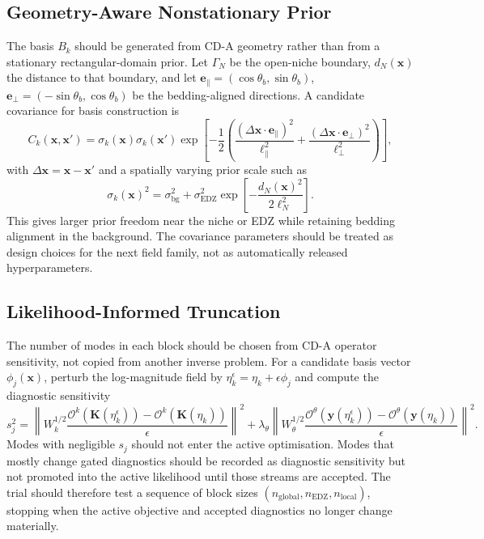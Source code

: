 \documentclass[10pt,a4paper]{article}
\newcommand{\K}{\bm K}
\newcommand{\Oop}{\mathcal O}
\begin{document}
\subsection{Geometry-Aware Nonstationary Prior}

The basis \(B_k\) should be generated from CD-A geometry rather than from a
stationary rectangular-domain prior.  Let \(\Gamma_N\) be the open-niche boundary,
\(d_N(\bm x)\) the distance to that boundary, and let
\(\bm e_\parallel=(\cos\theta_b,\sin\theta_b)\),
\(\bm e_\perp=(-\sin\theta_b,\cos\theta_b)\) be the bedding-aligned directions.
A candidate covariance for basis construction is
\[
C_k(\bm x,\bm x')
=\sigma_k(\bm x)\sigma_k(\bm x')
\exp\!\left[
-\frac12
\left(
\frac{(\Delta\bm x\cdot\bm e_\parallel)^2}{\ell_\parallel^2}
+
\frac{(\Delta\bm x\cdot\bm e_\perp)^2}{\ell_\perp^2}
\right)
\right],
\]
with \(\Delta\bm x=\bm x-\bm x'\) and a spatially varying prior scale such as
\[
  \sigma_k(\bm x)^2
  =\sigma_{\mathrm{bg}}^2
  +\sigma_{\mathrm{EDZ}}^2
   \exp\!\left[-\frac{d_N(\bm x)^2}{2\ell_N^2}\right].
\]
This gives larger prior freedom near the niche or EDZ while retaining bedding
alignment in the background.  The covariance parameters should be treated as
design choices for the next field family, not as automatically released
hyperparameters.

\subsection{Likelihood-Informed Truncation}

The number of modes in each block should be chosen from CD-A operator sensitivity,
not copied from another inverse problem.  For a candidate basis vector
\(\phi_j(\bm x)\), perturb the log-magnitude field by
\(\eta_k^\epsilon=\eta_k+\epsilon\phi_j\) and compute the diagnostic sensitivity
\[
  s_j^2 =
  \left\|
  W_k^{1/2}
  \frac{\Oop^k(\K(\eta_k^\epsilon))-\Oop^k(\K(\eta_k))}{\epsilon}
  \right\|^2
  +\lambda_\theta
  \left\|
  W_\theta^{1/2}
  \frac{\Oop^\theta(\bm y(\eta_k^\epsilon))-\Oop^\theta(\bm y(\eta_k))}
       {\epsilon}
  \right\|^2 .
\]
Modes with negligible \(s_j\) should not enter the active optimisation.  Modes that
mostly change gated diagnostics should be recorded as diagnostic sensitivity but
not promoted into the active likelihood until those streams are accepted.  The
trial should therefore test a sequence of block sizes
\((n_{\mathrm{global}},n_{\mathrm{EDZ}},n_{\mathrm{local}})\), stopping when the
active objective and accepted diagnostics no longer change materially.
\end{document}
